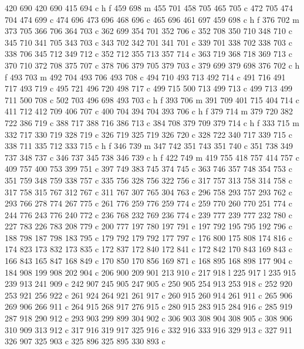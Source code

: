 {{   420 690 420 690 415 694 c
   h f
   459 698 m
   455 701 458 705 465 705 c
   472 705 474 704 474 699 c
   474 696 473 696 468 696 c
   465 696 461 697 459 698 c
   h f
   376 702 m
   373 705 366 706 364 703 c
   362 699 354 701 352 706 c
   352 708 350 710 348 710 c
   345 710 341 705 343 703 c
   343 702 342 701 341 701 c
   339 701 338 702 338 703 c
   338 706 345 712 349 712 c
   352 712 355 713 357 714 c
   363 719 368 718 369 713 c
   370 710 372 708 375 707 c
   378 706 379 705 379 703 c
   379 699 379 698 376 702 c
   h f
   493 703 m
   492 704 493 706 493 708 c
   494 710 493 713 492 714 c
   491 716 491 717 493 719 c
   495 721 496 720 498 717 c
   499 715 500 713 499 713 c
   499 713 499 711 500 708 c
   502 703 496 698 493 703 c
   h f
   393 706 m
   391 709 401 715 404 714 c
   411 712 412 709 406 707 c
   400 704 394 704 393 706 c
   h f
   379 714 m
   379 720 382 722 386 719 c
   388 717 388 716 386 713 c
   384 708 379 709 379 714 c
   h f
   333 715 m
   332 717 330 719 328 719 c
   326 719 325 719 326 720 c
   328 722 340 717 339 715 c
   338 711 335 712 333 715 c
   h f
   346 739 m
   347 742 351 743 351 740 c
   351 738 349 737 348 737 c
   346 737 345 738 346 739 c
   h f
   422 749 m
   419 755 418 757 414 757 c
   409 757 400 753 399 751 c
   397 749 383 745 374 745 c
   363 746 357 748 354 753 c
   351 759 348 759 338 757 c
   335 756 328 756 322 756 c
   317 757 313 758 314 758 c
   317 758 315 767 312 767 c
   311 767 307 765 304 763 c
   296 758 293 757 293 762 c
   293 766 278 774 267 775 c
   261 776 259 776 259 774 c
   259 770 260 770 251 774 c
   244 776 243 776 240 772 c
   236 768 232 769 236 774 c
   239 777 239 777 232 780 c
   227 783 226 783 208 779 c
   200 777 197 780 197 791 c
   197 792 195 795 192 796 c
   188 798 187 798 183 795 c
   179 792 179 792 177 797 c
   176 800 175 808 174 816 c
   174 823 173 832 173 835 c
   172 837 172 840 172 841 c
   172 842 170 843 169 843 c
   166 843 165 847 168 849 c
   170 850 170 856 169 871 c
   168 895 168 898 177 904 c
   184 908 199 908 202 904 c
   206 900 209 901 213 910 c
   217 918 l
   225 917 l
   235 915 239 913 241 909 c
   242 907 245 905 247 905 c
   250 905 254 913 253 918 c
   252 920 253 921 256 922 c
   261 924 264 921 261 917 c
   260 915 260 914 261 911 c
   265 906 269 906 266 911 c
   264 915 268 917 276 915 c
   280 915 283 915 284 916 c
   285 919 287 918 290 912 c
   293 903 299 899 304 902 c
   306 903 308 904 308 905 c
   308 906 310 909 313 912 c
   317 916 319 917 325 916 c
   332 916 333 916 329 913 c
   327 911 326 907 325 903 c
   325 896 325 895 330 893 c
}}
